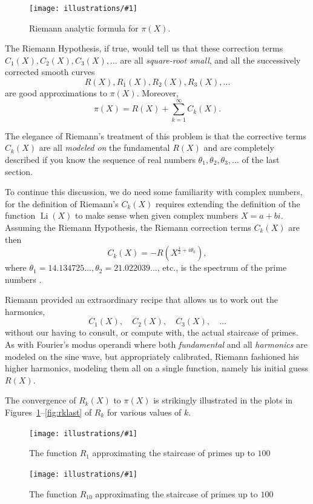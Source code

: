 \documentclass[openany]{book}
\DeclareMathOperator{\Li}{Li}
\newcommand{\ill}[3]{%
   \begin{figure}[H]%
   \vspace{-2ex}
   \centering%
   \texttt{[image: illustrations/\#1]}%
   \caption{#3}%
   \vspace{-2ex}
    \end{figure}}
\theoremstyle{plain}
\theoremstyle{definition}
\newcommand{\RH}{Riemann Hypothesis\index{Riemann Hypothesis}}
\begin{document}
{{\ill{riemann_Rk}{0.8}{Riemann analytic formula for $\pi(X)$.}

The \RH{}, if true, would tell us that these correction
terms $C_1(X), C_2(X), C_3(X),\dots$ are all {\em square-root small},
and all the successively corrected smooth curves $$R(X), R_1(X),
R_2(X),R_3(X),\dots$$ are good approximations to $\pi(X)$.
Moreover,
$$
 \pi(X) = R(X) + \sum_{k=1}^{\infty} C_k(X).
$$

The elegance of Riemann's treatment of this problem is that the
corrective terms $C_k(X)$ are all {\em modeled on} the fundamental
$R(X)$ and are completely described if you know the sequence of real
numbers $\theta_1, \theta_2, \theta_3,\dots$ of the last section.


To continue this discussion, we do need some familiarity with complex numbers, for the definition of Riemann's $C_k(X)$
requires extending
the definition of the function $\Li(X)$ to make sense when given
complex numbers $X=a+bi$.  Assuming the \RH{}, the Riemann correction
terms $C_k(X)$ are then
$$
   C_k(X)= -R(X^{\frac{1}{2} + i\theta_k}),
$$
where $\theta_1 = 14.134725\dots, \theta_2 = 21.022039\dots$, etc.,
is the spectrum of the prime numbers .

Riemann provided an extraordinary recipe that allows us to work
out the harmonics, $$C_1(X),\quad C_2(X),\quad C_3(X),\quad \dots$$ without our having
to consult, or compute with, the actual staircase of primes. As with
Fourier's modus operandi where both {\em fundamental} and all {\em
  harmonics} are modeled on the sine wave, but appropriately
calibrated, Riemann fashioned his higher harmonics, modeling them all
on a single function, namely his initial guess $R(X)$.

The convergence of $R_k(X)$ to $\pi(X)$ is strikingly illustrated
in the plots in Figures~\ref{fig:rkfirst}--\ref{fig:rklast} of $R_k$ for various values of $k$.


\ill{Rk_1_2_100}{.9}{The function $R_{1}$ approximating the staircase of primes up to $100$\label{fig:rkfirst}}

\ill{Rk_10_2_100}{.9}{The function $R_{10}$ approximating the staircase of primes up to $100$}

}}
\end{document}
